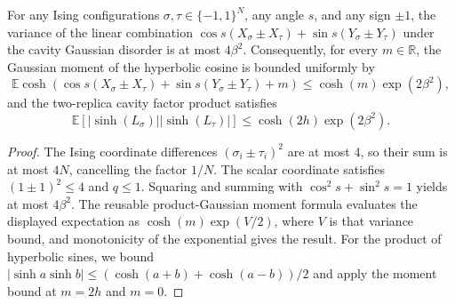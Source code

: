 \begin{lemma}
\label{lem:sg-tal:cavity-linear-combo-var}
  \leanok
{}
For any Ising configurations $\sigma, \tau \in \{-1, 1\}^N$, any angle $s$, and any sign $\pm 1$, the variance of
the linear combination $\cos s (X_\sigma \pm X_\tau) + \sin s (Y_\sigma \pm Y_\tau)$ under the cavity Gaussian disorder
is at most $4 \beta^2$.
Consequently, for every $m\in\mathbb R$, the Gaussian moment of the hyperbolic cosine is bounded
uniformly by
\[
  \mathbb E\cosh\!\left(\cos s(X_\sigma\pm X_\tau)
    +\sin s(Y_\sigma\pm Y_\tau)+m\right)
  \le \cosh(m)\exp(2\beta^2),
\]
and the two-replica cavity factor product satisfies
\[
  \mathbb E [ |\sinh(L_\sigma)| |\sinh(L_\tau)| ] \le \cosh(2h)\exp(2\beta^2).
\]
\end{lemma}
\begin{proof}
  \leanok
The Ising coordinate differences $(\sigma_i \pm \tau_i)^2$ are at most $4$, so their sum is at most $4N$, cancelling
the factor $1/N$. The scalar coordinate satisfies $(1 \pm 1)^2 \le 4$ and $q \le 1$. Squaring and summing with
$\cos^2 s + \sin^2 s = 1$ yields at most $4 \beta^2$.
The reusable product-Gaussian moment formula evaluates the displayed expectation as
$\cosh(m)\exp(V/2)$, where $V$ is that variance bound, and monotonicity of the exponential gives
the result. For the product of hyperbolic sines, we bound $|\sinh a \sinh b| \le (\cosh(a+b) + \cosh(a-b))/2$
and apply the moment bound at $m = 2h$ and $m = 0$.
\end{proof}

